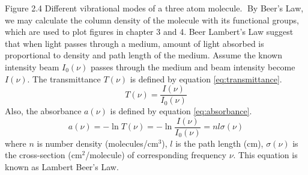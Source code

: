 Figure 2.4 Different vibrational modes of a three atom molecule.
By Beer’s Law, we may calculate the column density of the molecule with its functional groups, which are used to plot figures in chapter 3 and 4. Beer Lambert’s Law suggest that when light passes through a medium, amount of light absorbed is proportional to density and path length of the medium. Assume the known intensity beam $I_{0}(\nu)$ passes through the medium and beam intensity become $I(\nu)$. The transmittance $T(\nu)$ is defined by equation \ref{eq:transmittance}. \\
\begin{equation}
T(\nu) = \frac{I(\nu)}{I_{0}(\nu)}
\label{eq:transmittance}
\end{equation}
Also, the absorbance $a(\nu)$ is defined by equation \ref{eq:absorbance}. \\
\begin{equation}
a(\nu) = - \ln T(\nu) = - \ln \frac{I(\nu)}{I_{0}(\nu)} = n l \sigma(\nu)
\label{eq:absorbance}
\end{equation}
where $n$ is number density (molecules/cm$^3$), $l$ is the path length (cm), $\sigma(\nu)$ is the cross-section (cm$^2$/molecule) of corresponding frequency $\nu$. This equation is known as Lambert Beer’s Law.







